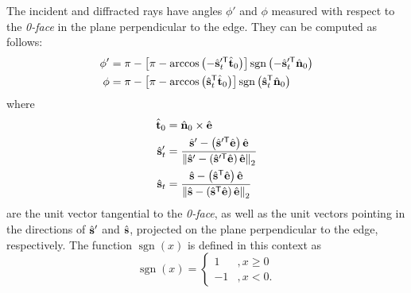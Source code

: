 The incident and diffracted rays have angles $\phi'$ and $\phi$ measured with respect to the \emph{0-face} in the plane perpendicular to the edge.
They can be computed as follows:
\begin{align}
    \phi' & = \pi - \left[\pi - \arccos\left(-\hat{\mathbf{s}}_t'^{\textsf{T}} \hat{\mathbf{t}}_0\right)\right] \operatorname{sgn}\left(-\hat{\mathbf{s}}_t'^{\textsf{T}} \hat{\mathbf{n}}_0\right) \\
    \phi & = \pi - \left[\pi - \arccos\left(\hat{\mathbf{s}}_t^{\mathsf{T}} \hat{\mathbf{t}}_0\right)\right] \operatorname{sgn}\left(\hat{\mathbf{s}}_t^{\mathsf{T}} \hat{\mathbf{n}}_0\right)
\end{align}
where
\begin{align}
    \hat{\mathbf{t}}_0 &= \hat{\mathbf{n}}_0 \times \hat{\mathbf{e}}\\
    \hat{\mathbf{s}}'_t &= \frac{ \hat{\mathbf{s}}' - \left(\hat{\mathbf{s}}'^{\textsf{T}}\hat{\mathbf{e}}\right)\hat{\mathbf{e}} }{\left\lVert\hat{\mathbf{s}}' - \left(\hat{\mathbf{s}}'^{\textsf{T}}\hat{\mathbf{e}}\right)\hat{\mathbf{e}}\right\rVert_2  }\\
    \hat{\mathbf{s}}_t  &= \frac{ \hat{\mathbf{s}} - \left(\hat{\mathbf{s}}^{\mathsf{T}}\hat{\mathbf{e}}\right)\hat{\mathbf{e}} }{\left\lVert\hat{\mathbf{s}} - \left(\hat{\mathbf{s}}^{\mathsf{T}}\hat{\mathbf{e}}\right)\hat{\mathbf{e}}\right\rVert_2  }
\end{align}
are the unit vector tangential to the \emph{0-face}, as well as the unit vectors pointing in the directions of $\hat{\mathbf{s}}'$ and $\hat{\mathbf{s}}$, projected on the plane perpendicular to the edge, respectively. The function $\mathop{\text{sgn}}(x)$ is defined in this context as
\begin{equation}
\mathop{\text{sgn}}(x) = \begin{cases}
                            1  &, x \geq 0\\
                            -1 &, x< 0.
                            \end{cases}
\end{equation}

